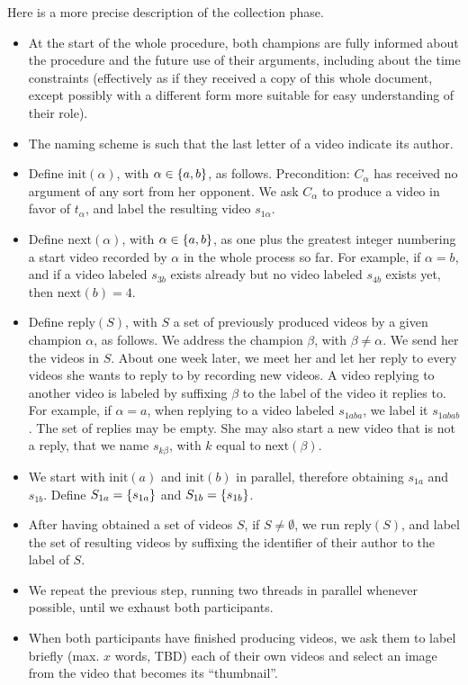 \documentclass[version=3.21, pagesize, twoside=off, bibliography=totoc, DIV=calc, fontsize=12pt, a4paper]{scrartcl}
\begin{document}
Here is a more precise description of the collection phase.

\begin{itemize}
	\item At the start of the whole procedure, both champions are fully informed about the procedure and the future use of their arguments, including about the time constraints (effectively as if they received a copy of this whole document, except possibly with a different form more suitable for easy understanding of their role).
	\item The naming scheme is such that the last letter of a video indicate its author.
	\item Define $\text{init}(\alpha)$, with $\alpha \in \{a, b\}$, as follows. Precondition: $C_\alpha$ has received no argument of any sort from her opponent. We ask $C_\alpha$ to produce a video in favor of $t_\alpha$, and label the resulting video $s_{1 \alpha}$.
	\item Define $\text{next}(\alpha)$, with $\alpha \in \{a, b\}$, as one plus the greatest integer numbering a start video recorded by $\alpha$ in the whole process so far. For example, if $\alpha = b$, and if a video labeled $s_{3b}$ exists already but no video labeled $s_{4b}$ exists yet, then $\text{next}(b) = 4$.
	\item Define $\text{reply}(S)$, with $S$ a set of previously produced videos by a given champion $\alpha$, as follows. We address the champion $\beta$, with $\beta ≠ \alpha$. We send her the videos in $S$. About one week later, we meet her and let her reply to every videos she wants to reply to by recording new videos. A video replying to another video is labeled by suffixing $\beta$ to the label of the video it replies to. For example, if $\alpha = a$, when replying to a video labeled $s_{1aba}$, we label it $s_{1abab}$. The set of replies may be empty. She may also start a new video that is not a reply, that we name $s_{k\beta}$, with $k$ equal to $\text{next}(\beta)$.
	\item We start with $\text{init}(a)$ and $\text{init}(b)$ in parallel, therefore obtaining $s_{1a}$ and $s_{1b}$. Define $S_{1a} = \{s_{1a}\}$ and $S_{1b} = \{s_{1b}\}$.
	\item After having obtained a set of videos $S$, if $S ≠ \emptyset$, we run $\text{reply}(S)$, and label the set of resulting videos by suffixing the identifier of their author to the label of $S$. 
	\item We repeat the previous step, running two threads in parallel whenever possible, until we exhaust both participants.
	\item When both participants have finished producing videos, we ask them to label briefly (max. $x$ words, TBD) each of their own videos and select an image from the video that becomes its “thumbnail”.
\end{itemize}
\end{document}
